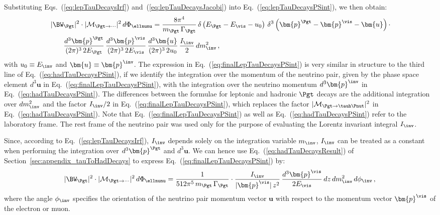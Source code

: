 Substituting Eqs.~(\ref{eq:lepTauDecaysIrf})
and~(\ref{eq:lepTauDecaysJacobi}) into
Eq.~(\ref{eq:lepTauDecaysPSint}), we then obtain:
\begin{equation}
\begin{aligned}
& \, \vert \BW_{\Pgt} \vert^{2} \cdot \vert\mathcal{M}_{\Pgt\to\cdots}\vert^{2} \,
 d\Phi_{\ellnunu} = \frac{8\pi^{4}}{m_{\Pgt} \, \Gamma_{\Pgt}} \,
 \delta \left( E_{\Pgt} - E_{\vis} - u_{0} \right)
 \, \delta^{3} \left( \bm{p}^{\Pgt} - \bm{p}^{\vis} -
  \bm{u} \right) \cdot \nonumber \\
& \qquad \frac{d^{3}\bm{p}^{\Pgt}}{(2\pi)^{3} \, 2 E_{\Pgt}} \,
  \frac{d^{3}\bm{p}^{\vis}}{(2\pi)^{3} \, 2 E_{\vis}} \, 
  \frac{d^{3}\bm{u}}{(2\pi)^{3} \, 2 u_{0}} \, \frac{I_{\inv}}{2} \,
  dm^{2}_{\inv} \, ,
\end{aligned}
\label{eq:finalLepTauDecaysPSint}
\end{equation}
with $u_{0} \equiv E_{\inv}$ and $\bm{u} \equiv \bm{p}^{\inv}$.
The expression in Eq.~(\ref{eq:finalLepTauDecaysPSint}) is very similar in structure to the third line of Eq.~(\ref{eq:hadTauDecaysPSint}),
if we identify the integration over the momentum of the neutrino pair,
given by the phase space element $d^{3}\bm{u}$ in Eq.~(\ref{eq:finalLepTauDecaysPSint}), 
with the integration over the neutrino momentum $d^{3}\bm{p}^{\inv}$ in Eq.~(\ref{eq:hadTauDecaysPSint}).
The differences between the formulae for leptonic and hadronic $\Pgt$ decays
are the additional integration over $dm^{2}_{\inv}$ and the
factor $I_{\inv}/2$ in Eq.~(\ref{eq:finalLepTauDecaysPSint}), which replaces the
factor $\vert\mathcal{M}_{\Pgt \to
  \tauh\Pnut}\vert^{2}$ in Eq.~(\ref{eq:hadTauDecaysPSint}).
Note that Eq.~(\ref{eq:finalLepTauDecaysPSint}) as well as Eq.~(\ref{eq:hadTauDecaysPSint}) refer to the laboratory frame.
The rest frame of the neutrino pair was used only for the purpose of evaluating the Lorentz invariant integral $I_{\inv}$.

Since, according to Eq.~(\ref{eq:lepTauDecaysIrf}), $I_{\inv}$ 
depends solely on the integration variable $m_{\inv}$, 
$I_{\inv}$ can be treated as a constant when performing the integration over $d^{3}\bm{p}^{\Pgt}$ and $d^{3}\bm{u}$.
We can hence use Eq.~(\ref{eq:hadTauDecaysResult}) of Section~\ref{sec:appendix_tauToHadDecays} to express Eq.~(\ref{eq:finalLepTauDecaysPSint}) by:
\begin{align}
\vert \BW_{\Pgt} \vert^{2} \cdot \vert\mathcal{M}_{\Pgt\to\cdots}\vert^{2} \,
 d\Phi_{\ellnunu} = \frac{1}{512\pi^{5}\, m_{\Pgt} \, \Gamma_{\Pgt}} \cdot 
    \frac{I_{\inv}}{\vert\bm{p}^{\vis}\vert \, z^{2}} \, 
    \frac{d^{3}\bm{p}^{\vis}}{2 E_{\vis}} \, dz \, dm^{2}_{\inv} \,
    d\phi_{\inv} \, ,
\label{eq:lepTauDecaysResult}
\end{align}
where the angle $\phi_{\inv}$ specifies the orientation of the neutrino
pair momentum vector $\bm{u}$ with respect to the momentum vector $\bm{p}^{\vis}$
of the electron or muon.


